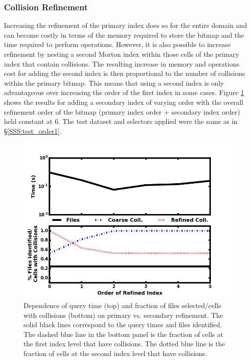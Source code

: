\documentclass[apjl]{emulateapj}
\begin{document}
\subsubsection{Collision Refinement}\label{SSS:test_order2}
Increasing the refinement of the primary index does so for the entire domain and can become costly in terms of the memory required to store the bitmap and the time required to perform operations. However, it is also possible to increase refinement by nesting a second Morton index within those cells of the primary index that contain collisions. The resulting increase in memory and operations cost for adding the second index is then proportional to the number of collisions within the primary bitmap. This means that using a second index is only advantageous over increasing the order of the first index in some cases. Figure \ref{fig:test_order2} shows the results for adding a secondary index of varying order with the overall refinement order of the bitmap (primary index order + secondary index order) held constant at 6. The test dataset and selectors applied were the same as in \S\ref{SSS:test_order1}.
%
\begin{figure}[htbp]
\begin{center}
\includegraphics[width=\columnwidth,keepaspectratio]{../images/vary_order2_np1024_nf512.png}
\caption{Dependence of query time (top) and fraction of files selected/cells with collisions (bottom) on primary vs. secondary refinement. The solid black lines correspond to the query times and files identified. The dashed blue line in the bottom panel is the fraction of cells at the first index level that have collisions. The dotted blue line is the fraction of cells at the second index level that have collisions.}
\label{fig:test_order2}
\end{center}
\end{figure}
%
\end{document}
